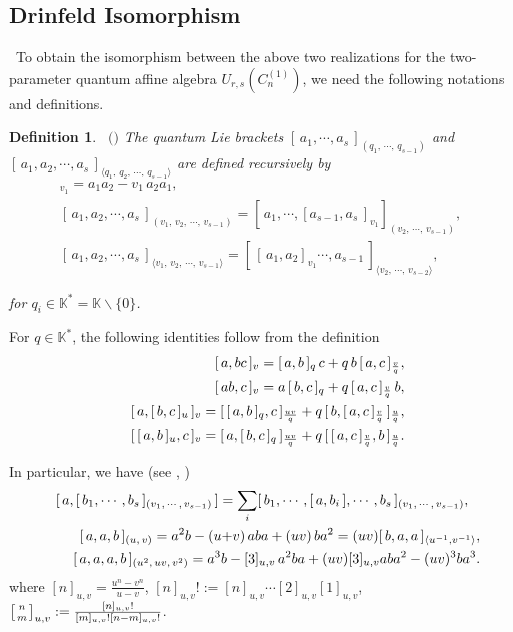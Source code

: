 \documentclass{amsproc}
\newtheorem{defi}[theo]{Definition}
\theoremstyle{remark}
\numberwithin{equation}{section}
\begin{document}
\subsection{Drinfeld Isomorphism}  \ To obtain the
isomorphism between the above two realizations for the two-parameter
quantum affine algebra $U_{r,s}(C_n^{(1)})$, we need the following
notations and definitions.
\begin{defi}\ $($\cite{HRZ}$)$ The quantum Lie brackets $[\,a_1,\cdots,
a_s\,]_{(q_1,\,\cdots,\, q_{s-1})}$ and $[\,a_1, a_2, \cdots,
a_s\,]_{{\langle} q_1,\,q_2,\,\cdots, \,q_{s-1}{\rangle}}$ are defined
recursively by
\begin{gather*}    [\,a_1, a_2\,]_{v_1}=a_1a_2-v_1\,a_2a_1,\\
   [\,a_1, a_2, \cdots, a_s\,]_{(v_1,\,v_2,\,\cdots,
  \,v_{s-1})}=[\,a_1, \cdots, [a_{s-1},
  a_s\,]_{v_1}]_{(v_2,\,\cdots,\,v_{s-1})},\\
  [\,a_1, a_2, \cdots, a_s\,]_{{\langle} v_1,\,v_2,\,\cdots,
  \,v_{s-1}{\rangle}}=[\,[\,a_1, a_2]_{v_1} \cdots, a_{s-1}\,]_{{\langle}
  v_2,\,\cdots,\,v_{s-2}{\rangle}},
 \end{gather*}

\noindent
for $q_i\in \mathbb K^*=\mathbb{K}\backslash \{0\}$.
\end{defi}

For $q\in\mathbb K^*$, the following identities follow from the
definition
\begin{eqnarray}
&&[\,a, bc\,]_v=[\,a, b\,]_q\,c+q\,b\,[\,a, c\,]_{\frac{v}q},\\
&&[\,ab, c\,]_v=a\,[\,b, c\,]_q+q\,[\,a, c\,]_{\frac{v}q}\,b, \\
&&{\label{b:3}[\,a,[\,b,c\,]_u\,]_v=[\,[\,a,b\,]_q,
c\,]_{\frac{uv}q}+q\,[\,b,[\,a,c\,] _{\frac{v}q}\,]_{\frac{u}q},}\\
&&{\label{b:4}[\,[\,a,b\,]_u,c\,]_v=[\,a,[\,b,c\,]_q\,]_{\frac{uv}q}+q\,[\,[\,a,c\,]
_{\frac{v}q},b\,]_{\frac{u}q}}.
\end{eqnarray}

In particular, we have (see \cite{HRZ}, \cite{HZ})
\begin{eqnarray}
&&{\label{b:5}[\,a, [\,b_1, \cdots, b_s\,]_{(v_1,\,\cdots,\,
v_{s-1})}\,]=\sum\limits_i[\,b_1,\cdots,[\,a, b_i\,],
\cdots,b_s\,]_{(v_1,\,\cdots,\, v_{s-1})},\hskip0.3cm }\\
&&{\label{b:6}[\,a, a, b\,]_{(u,\,
v)}=a^2b-(u{+}v)\,aba+(uv)\,ba^2=(uv)[\,b, a, a\,]_{{\langle} u^{-1},v^{-1}{\rangle}},} \\
&&[\,a, a, a, b\,]_{(u^2,\,uv,\,v^2)}=a^3b-[3]_{u,v}\,a^2ba
+(uv)[3]_{u,v}aba^2-(uv)^3ba^3.\nonumber
\end{eqnarray}
where $[n]_{u,v}=\frac{u^n{-}v^n}{u{-}v}$,
$[n]_{u,v}!:=[n]_{u,v}\cdots [2]_{u,v}[1]_{u,v}$, $\left[n\atop
m\right]_{u,v}:=\frac{[n]_{u,v}!}{[m]_{u,v}![n-m]_{u,v}!}$.
\end{document}
